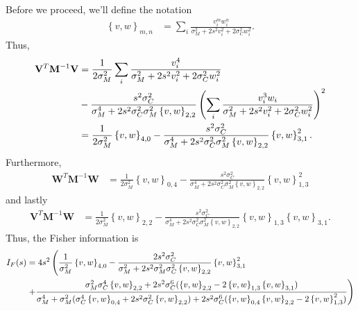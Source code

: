 \documentclass[11pt]{article}
\begin{document}
	Before we proceed, we'll define the notation 
	\begin{align}
	\left\{v, w\right\}_{m,n} &= \sum_i \frac{v_i^m w_i^n}{\sigma_M^2 + 2s^2 v_i^2 + 2\sigma_C^2 w_i^2}.
	\end{align}
	Thus,
	\begin{align}
	\mathbf{V}^T \mathbf{M}^{-1}\mathbf{V} &= \frac{1}{2\sigma_M^2}\sum_i \frac{v_i^4}{\sigma_M^2 + 2s^2 v_i^2  +2\sigma_C^2 w_i^2} \notag \\
	&- \frac{s^2\sigma_C^2}{\sigma_M^4 + 2s^2 \sigma_C^2 \sigma_M^2 \left\{v,w\right\}_{2,2}} \left(\sum_i\frac{v_i^3 w_i}{\sigma_M^2 + 2s^2 v_i^2 + 2 \sigma_C^2 w_i^2}\right)^2 \\
	&= \frac{1}{2\sigma_M^2}\left\{v,w\right\}_{4,0} - \frac{s^2 \sigma_C^2}{\sigma_M^4 + 2s^2 \sigma_C^2 \sigma_M^2 \left\{v,w\right\}_{2,2}} \left\{v,w\right\}_{3,1}^2.
	\end{align}
	Furthermore,
	\begin{align}
	\mathbf{W}^T \mathbf{M}^{-1}\mathbf{W}  &= \frac{1}{2\sigma_M^2}\left\{v,w\right\}_{0,4} - \frac{s^2\sigma_C^2}{\sigma_M^4 + 2s^2 \sigma_C^2 \sigma_M^2 \left\{v,w\right\}_{2,2}} \left\{v,w\right\}_{1,3}^2
	\end{align}
	and lastly
	\begin{align}
	\mathbf{V}^T \mathbf{M}^{-1} \mathbf{W} &= \frac{1}{2\sigma_M^2}\left\{v,w\right\}_{2,2} - \frac{s^2\sigma_C^2}{\sigma_M^4 + 2s^2\sigma_C^2 \sigma_M^2\left\{v,w\right\}_{2,2}} \left\{v,w\right\}_{1,3}\left\{v,w\right\}_{3,1}.
	\end{align}
	Thus, the Fisher information is 
	\begin{align}
	I_F(s) &= 4s^2 \left(\frac{1}{\sigma_M^2}\left\{v, w\right\}_{4,0} - \frac{2s^2 \sigma_C^2}{\sigma_M^2 + 2s^2 \sigma_M^2 \sigma_C^2 \left\{v,w\right\}_{2,2}} \left\{v,w\right\}_{3,1}^2  \right. \notag \\
	&\left. + \frac{\sigma_M^2 \sigma_C^4 \left\{v,w\right\}_{2,2} + 2s^2 \sigma_C^6 (\left\{v,w\right\}_{2,2} - 2 \left\{v,w\right\}_{1,3} \left\{v,w\right\}_{3,1})}{\sigma_M^4  + \sigma_M^2 (\sigma_C^4 \left\{v,w\right\}_{0,4} + 2s^2 \sigma_C^2 \left\{v,w\right\}_{2,2}) + 2s^2 \sigma_C^6 (\left\{v,w\right\}_{0,4} \left\{v,w\right\}_{2,2} - 2 \left\{v,w\right\}_{1,3}^2)}\right)
	\end{align}
	
\end{document}
